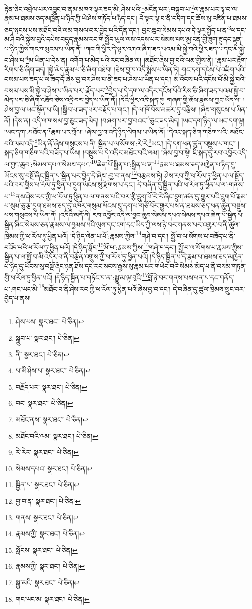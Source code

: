 རྟེན་ཅིང་འབྲེལ་པར་འབྱུང་བ་ནམ་མཁའ་ལྟར་ཟད་མི་:ཤེས་པའི་\footnote{ཤེས་པས་  སྣར་ཐང་།  པེ་ཅིན། }མངོན་པར་:བསྒྲུབ་པ་\footnote{སྒྲུབ་པ་  སྣར་ཐང་།  པེ་ཅིན། }ལ་རྣམ་པར་ལྟ་བ་ལ་རྣམ་པ་ཐམས་ཅད་མཁྱེན་པ་ཉིད་ཀྱི་ཡེ་ཤེས་གཏོད་པ་ཉིད་དང་། དེ་ལྟར་ལྟ་བ་ནི་བདག་དང་ཆོས་སུ་འཛིན་པ་ཐམས་ཅད་སྤངས་པས་མཐོང་བའི་ལམ་གསལ་བར་བྱེད་པའི་དོན་དང་། བྱང་ཆུབ་སེམས་དཔའ་དེ་ལྟར་སྤྱོད་པ་ན་\footnote{ནི་  སྣར་ཐང་།  པེ་ཅིན། }ཕ་དང་མ་ཤི་བའི་སྐྱེས་བུའི་དཔེས་བདུད་རྣམས་རང་གི་སྤྱོད་ཡུལ་ལས་འདས་པར་སེམས་པས་མྱ་ངན་གྱི་ཟུག་རྔུ་དང་ལྡན་པ་ཉིད་ཀྱིས་གང་གསུངས་པ་ཡིན་ནོ། །གང་གི་ཕྱིར་དེ་ལྟར་འགའ་ཞིག་ཟད་པའམ་མི་སྐྱེ་བའི་ཕྱིར་ཟད་པ་དང་མི་སྐྱེ་བ་ཤེས་པ་\footnote{པ་མི་ཤེས་པ་  སྣར་ཐང་།  པེ་ཅིན། }མ་ཡིན་པ་དེས་ན། འགོག་པ་མེད་པའི་རང་བཞིན་ལ། །མཐོང་ཞེས་བྱ་བའི་ལམ་གྱིས་ནི། །རྣམ་པར་རྟོག་རིགས་ཅི་ཞིག་ཟད། །སྐྱེ་མེད་རྣམ་པ་ཅི་ཞིག་འཐོབ། །ཅེས་བྱ་བ་འདི་སྨོས་པ་ཡིན་ཏེ། གང་དག་དངོས་པོ་འཇིག་པའི་བསམ་པས་ཟད་པ་ལ་ཟད་དོ་ཞེས་བྱ་བར་ཤེས་པ་ནི་ཟད་པ་ཤེས་པ་ཡིན་པ་དང་། མ་འོངས་པའི་དངོས་པོ་མི་སྐྱེ་བའི་བསམ་པས་མི་སྐྱེ་བ་ཤེས་པ་ཡིན་པར་:རྗོད་པར་\footnote{བརྗོད་པར་  སྣར་ཐང་།  པེ་ཅིན། }བྱེད་པ་དེ་དག་ལ་འདིར་དངོས་པོའི་རིས་ཅི་ཞིག་ཟད་པའམ་སྐྱེ་བ་མེད་པར་ཅི་ཞིག་འཐོབ་ཅེས་འདྲི་བར་བྱེད་པ་ཡིན་ནོ། །དེའི་ཕྱིར་འདི་སྐད་དུ། གཞན་གྱི་ཆོས་རྣམས་ཀྱང་ཡོད་ལ། །ཤེས་བྱ་ལ་ཡང་སྟོན་པ་ཡི། །སྒྲིབ་པ་ཟད་པར་བརྗོད་པ་གང་། །དེ་ལ་ཁོ་བོས་མཚར་དུ་བརྩིས། །ཞེས་གསུངས་པ་ཡིན་ནོ། །དེས་ན། འདི་ལ་གསལ་བྱ་ཅུང་ཟད་མེད། །བཞག་པར་བྱ་བའང་\footnote{བང་  སྣར་ཐང་།  པེ་ཅིན། }ཅུང་ཟད་མེད། །ཡང་དག་ཉིད་ལ་ཡང་དག་ལྟ། །ཡང་དག་:མཐོང་ན་\footnote{མཐོང་ནས་  སྣར་ཐང་།  པེ་ཅིན། }རྣམ་པར་གྲོལ། །ཞེས་བྱ་བ་འདི་ཉིད་ལེགས་པ་ཡིན་ནོ། །དེའང་སྐད་ཅིག་གཅིག་པའི་:མཐོང་བའི་ལམ་འདི་\footnote{མཐོང་བའི་ལམ་  སྣར་ཐང་།  པེ་ཅིན། }ཡིན་ནོ་ཞེས་གསུངས་པ་ནི། སྦྱིན་པ་ལ་སོགས་:རེ་རེ་\footnote{རེ་རེར་  སྣར་ཐང་།  པེ་ཅིན། }ཡང་། །དེ་དག་ཕན་ཚུན་བསྡུས་པ་གང་། །སྐད་ཅིག་གཅིག་པའི་བཟོད་པ་ཡིས། །བསྡུས་པ་དེ་འདིར་མཐོང་བའི་ལམ། །ཞེས་བྱ་བ་སྟེ། ཇི་སྐད་དུ་རབ་འབྱོར་འདི་ལ་བྱང་ཆུབ་:སེམས་དཔའ་སེམས་དཔའ་\footnote{སེམས་དཔའ་  སྣར་ཐང་།  པེ་ཅིན། }ཆེན་པོ་སྦྱིན་པ་:སྦྱིན་པ་ན་\footnote{སྦྱིན་པ་  སྣར་ཐང་།  པེ་ཅིན། }རྣམ་པ་ཐམས་ཅད་མཁྱེན་པ་ཉིད་དུ་ཡོངས་སུ་བསྔོ་ཞིང་སྦྱིན་པ་སྦྱིན་པར་བྱེད་དེ་ཞེས་:བྱ་བ་ནས་\footnote{བྱ་བ་ན་  སྣར་ཐང་།  པེ་ཅིན། }བརྩམས་ཏེ། ཤེས་རབ་ཀྱི་ཕ་རོལ་ཏུ་ཕྱིན་པ་ལ་སྤྱོད་པའི་བར་གྱིས་ཕ་རོལ་ཏུ་ཕྱིན་པ་དྲུག་ཡོངས་སུ་རྫོགས་པ་དང་། དེ་བཞིན་དུ་སྦྱིན་པའི་ཕ་རོལ་ཏུ་ཕྱིན་པ་ལ་:གནས་པ་\footnote{གནས་  སྣར་ཐང་།  པེ་ཅིན། }ནས་ཤེས་རབ་ཀྱི་ཕ་རོལ་ཏུ་ཕྱིན་པ་ལ་གནས་པའི་བར་གྱི་དྲུག་པོ་རེ་རེ་ཞིང་དྲུག་ཚན་དུ་གྱུར་པའི་དྲུག་པོ་རྣམ་པ་སུམ་ཅུ་རྩ་དྲུག་ཐམས་ཅད་དུ་འཁོར་གསུམ་ཡོངས་སུ་དག་པ་གཙོ་བོར་གྱུར་པས་ན་ཐམས་ཅད་ཕན་ཚུན་བསྡུས་པས་གསུངས་པ་ཡིན་ནོ། །འདིའི་མདོ་ནི། རབ་འབྱོར་འདི་ལ་བྱང་ཆུབ་སེམས་དཔའ་སེམས་དཔའ་ཆེན་པོ་སྦྱིན་པ་སྦྱིན་ཞིང་སེམས་ཅན་རྣམས་ལ་བྱམས་པའི་ལུས་དང་ངག་དང་ཡིད་ཀྱི་ལས་ཉེ་བར་གནས་པར་འགྱུར་བ་ནི་ཚུལ་ཁྲིམས་ཀྱི་ཕ་རོལ་ཏུ་ཕྱིན་པའོ། །དེ་ཉིད་ལེན་པ་པོ་:རྣམས་ཀྱིས་\footnote{རྣམས་ཀྱི་  སྣར་ཐང་།  པེ་ཅིན། }གཤེ་བ་དང་། སྤྱོ་བ་ལ་སོགས་པ་བཟོད་པ་ནི་བཟོད་པའི་ཕ་རོལ་ཏུ་ཕྱིན་པའོ། །དེ་ཉིད་སློང་\footnote{སློངས་  སྣར་ཐང་།  པེ་ཅིན། }མོ་པ་:རྣམས་ཀྱིས་\footnote{རྣམས་ཀྱི་  སྣར་ཐང་།  པེ་ཅིན། }གཤེ་བ་དང་། སྤྱོ་བ་ལ་སོགས་པ་རྣམས་ཀྱིས་སྦྱིན་པ་ལ་སྤྲོ་བ་མི་འདོར་བ་ནི་བརྩོན་འགྲུས་ཀྱི་ཕ་རོལ་ཏུ་ཕྱིན་པའོ། །དེ་ཉིད་སྦྱིན་པ་དེ་རྣམ་པ་ཐམས་ཅད་མཁྱེན་པ་ཉིད་དུ་ཡོངས་སུ་བསྔོ་ཞིང་ཉན་ཐོས་དང་རང་སངས་རྒྱས་སུ་རྣམ་པར་གཡེང་བའི་སེམས་མེད་པ་ནི་བསམ་གཏན་གྱི་ཕ་རོལ་ཏུ་ཕྱིན་པའོ། །དེ་ཉིད་སྦྱིན་པ་གཏོང་བ་ན་:སྒྱུ་མ་ལྟ་བུའི་\footnote{སྒྱུ་མའི་  སྣར་ཐང་།  པེ་ཅིན། }བློ་ཉེ་བར་གནས་པས་ཕན་པ་དང་གནོད་པ་:གང་ཡང་མི་\footnote{གང་ཡང་མ་  སྣར་ཐང་།  པེ་ཅིན། }མཐོང་བ་ནི་ཤེས་རབ་ཀྱི་ཕ་རོལ་ཏུ་ཕྱིན་པའོ་ཞེས་བྱ་བ་དང་། དེ་བཞིན་དུ་ཚུལ་ཁྲིམས་སྲུང་བར་བྱེད་པ་ནས། 